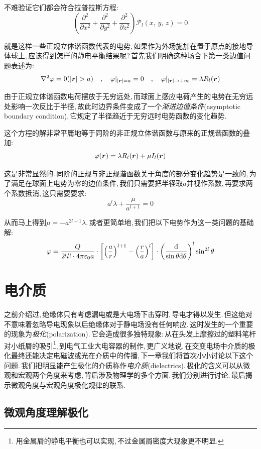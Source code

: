 不难验证它们都会符合拉普拉斯方程:
\[\left(\frac{\partial^2}{\partial x^2}+\frac{\partial^2}{\partial y^2}+\frac{\partial^2}{\partial z^2}\right)\mathcal{P}_l(x,\,y,\,z)=0\]

就是这样一些正规立体谐函数代表的电势,\,如果作为外场施加在置于原点的接地导体球上,\,应该得到怎样的静电平衡结果呢?\,首先我们明确这种场合下第一类边值问题表述为:
\[\nabla^2\varphi=0(|\bs{r}|>a)\quad ,\quad \varphi|_{|\bs{r}|=a}=0 \quad ,\quad \varphi|_{|\bs{r}|\to+ \infty}=\lambda R_l(\bs{r})\]

由于正规立体谐函数电荷摆放于无穷远处,\,而球面上感应电荷产生的电势在无穷远处影响一次反比于半径,\,故此时边界条件变成了一个\emph{渐进边值条件}(asymptotic boundary condition),\,它规定了半径趋近于无穷远时电势函数的变化趋势.

这个方程的解非常平庸地等于同阶的非正规立体谐函数与原来的正规谐函数的叠加:
\[\varphi(\boldsymbol{r})=\lambda R_l(\boldsymbol{r})+\mu I_l(\boldsymbol{r})\]

这是非常显然的.\,同阶的正规与非正规谐函数关于角度的部分变化趋势是一致的,\,为了满足在球面上电势为零的边值条件,\,我们只需要把半径取$a$并视作系数,\,再要求两个系数抵消,\,这只需要要求:
\[a^l\lambda+\frac{\mu}{a^{l+1}}=0\]

从而马上得到$\mu=-a^{2l+1}\lambda$.\,或者更简单地,\,我们把以下电势作为这一类问题的基础解:
\[\varphi=\frac{Q}{2^ll!\cdot 4\pi\varepsilon_0 a}\cdot\left[\left(\frac{a}{r}\right)^{l+1}-\left(\frac{r}{a}\right)^l\right]\cdot\left(\frac{\textrm{d}}{\sin\theta\textrm{d} \theta}\right)^l\sin^{2l}\theta\]



\section{电介质}

之前介绍过,\,绝缘体只有考虑漏电或是大电场下击穿时,\,导电才得以发生.\,但这绝对不意味着忽略导电现象以后绝缘体对于静电场没有任何响应.\,这时发生的一个重要的现象为\emph{极化}(polarization).\,它会造成很多独特现象:\,从在头发上摩擦过的塑料笔杆对小纸屑的吸引\footnote{用金属屑的静电平衡也可以实现,\,不过金属屑密度大现象更不明显.},\,到电气工业大电容器的制作,\,更广义地说,\,在交变电场中介质的极化最终还能决定电磁波或光在介质中的传播,\,下一章我们将首次小小讨论以下这个问题.\,我们把明显能产生极化的介质称作\emph{电介质}(dielectrics).\,极化的含义可以从微观和宏观两个角度来考虑,\,背后涉及物理学的多个方面.\,我们分别进行讨论.\,最后揭示微观角度与宏观角度极化规律的联系.\,

\subsection{微观角度理解极化}

